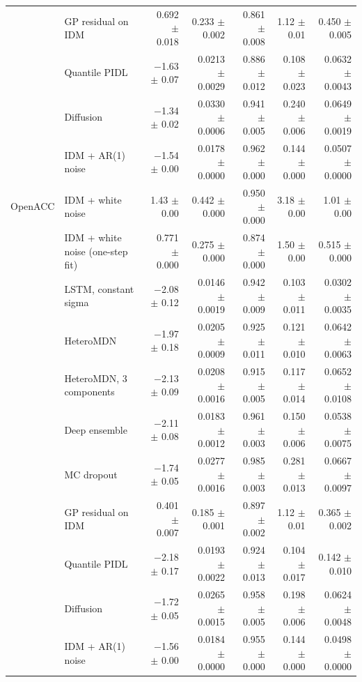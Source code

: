 \begin{longtable}{llrrrrr}
 & GP residual on IDM & 0.692 $\pm$ 0.018 & 0.233 $\pm$ 0.002 & 0.861 $\pm$ 0.008 & 1.12 $\pm$ 0.01 & 0.450 $\pm$ 0.005 \\
 & Quantile PIDL & $-$1.63 $\pm$ 0.07 & 0.0213 $\pm$ 0.0029 & 0.886 $\pm$ 0.012 & 0.108 $\pm$ 0.023 & 0.0632 $\pm$ 0.0043 \\
 & Diffusion & $-$1.34 $\pm$ 0.02 & 0.0330 $\pm$ 0.0006 & 0.941 $\pm$ 0.005 & 0.240 $\pm$ 0.006 & 0.0649 $\pm$ 0.0019 \\
 & IDM + AR(1) noise & $-$1.54 $\pm$ 0.00 & 0.0178 $\pm$ 0.0000 & 0.962 $\pm$ 0.000 & 0.144 $\pm$ 0.000 & 0.0507 $\pm$ 0.0000 \\
\midrule
OpenACC & IDM + white noise & 1.43 $\pm$ 0.00 & 0.442 $\pm$ 0.000 & 0.950 $\pm$ 0.000 & 3.18 $\pm$ 0.00 & 1.01 $\pm$ 0.00 \\
 & IDM + white noise (one-step fit) & 0.771 $\pm$ 0.000 & 0.275 $\pm$ 0.000 & 0.874 $\pm$ 0.000 & 1.50 $\pm$ 0.00 & 0.515 $\pm$ 0.000 \\
 & LSTM, constant sigma & $-$2.08 $\pm$ 0.12 & 0.0146 $\pm$ 0.0019 & 0.942 $\pm$ 0.009 & 0.103 $\pm$ 0.011 & 0.0302 $\pm$ 0.0035 \\
 & HeteroMDN & $-$1.97 $\pm$ 0.18 & 0.0205 $\pm$ 0.0009 & 0.925 $\pm$ 0.011 & 0.121 $\pm$ 0.010 & 0.0642 $\pm$ 0.0063 \\
 & HeteroMDN, 3 components & $-$2.13 $\pm$ 0.09 & 0.0208 $\pm$ 0.0016 & 0.915 $\pm$ 0.005 & 0.117 $\pm$ 0.014 & 0.0652 $\pm$ 0.0108 \\
 & Deep ensemble & $-$2.11 $\pm$ 0.08 & 0.0183 $\pm$ 0.0012 & 0.961 $\pm$ 0.003 & 0.150 $\pm$ 0.006 & 0.0538 $\pm$ 0.0075 \\
 & MC dropout & $-$1.74 $\pm$ 0.05 & 0.0277 $\pm$ 0.0016 & 0.985 $\pm$ 0.003 & 0.281 $\pm$ 0.013 & 0.0667 $\pm$ 0.0097 \\
 & GP residual on IDM & 0.401 $\pm$ 0.007 & 0.185 $\pm$ 0.001 & 0.897 $\pm$ 0.002 & 1.12 $\pm$ 0.01 & 0.365 $\pm$ 0.002 \\
 & Quantile PIDL & $-$2.18 $\pm$ 0.17 & 0.0193 $\pm$ 0.0022 & 0.924 $\pm$ 0.013 & 0.104 $\pm$ 0.017 & 0.142 $\pm$ 0.010 \\
 & Diffusion & $-$1.72 $\pm$ 0.05 & 0.0265 $\pm$ 0.0015 & 0.958 $\pm$ 0.005 & 0.198 $\pm$ 0.006 & 0.0624 $\pm$ 0.0048 \\
 & IDM + AR(1) noise & $-$1.56 $\pm$ 0.00 & 0.0184 $\pm$ 0.0000 & 0.955 $\pm$ 0.000 & 0.144 $\pm$ 0.000 & 0.0498 $\pm$ 0.0000 \\
\end{longtable}
\endgroup
